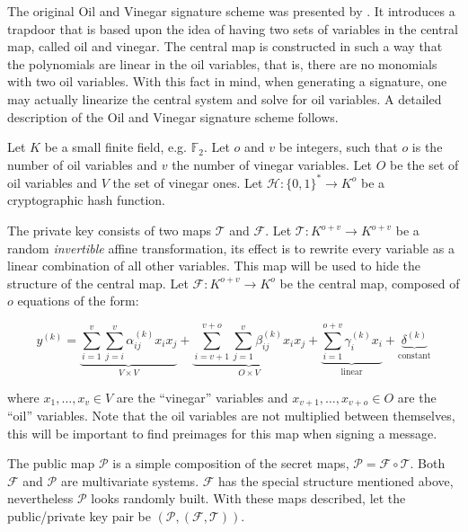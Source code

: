 \documentclass{ufsctex/ufsctex}
\begin{document}
The original Oil and Vinegar signature scheme was presented by
\cite{patarin1997ov}. It introduces a trapdoor that is based upon the idea of
having two sets of variables in the central map, called oil and vinegar. The
central map is constructed in such a way that the polynomials are linear in the
oil variables, that is, there are no monomials with two oil variables. With
this fact in mind, when generating a signature, one may actually linearize the
central system and solve for oil variables. A detailed description of the Oil
and Vinegar signature scheme follows.

Let $K$ be a small finite field, e.g. $\mathbb{F}_2$. Let $o$ and $v$ be
integers, such that $o$ is the number of oil variables and $v$ the number of
vinegar variables. Let $O$ be the set of oil variables and $V$ the set of
vinegar ones. Let $\mathcal{H}: \{0,1\}^* \to K^o$ be a cryptographic hash
function.

The private key consists of two maps $\mathcal{T}$ and $\mathcal{F}$. Let
$\mathcal{T}: K^{o+v} \to K^{o+v}$ be a random \textit{invertible} affine
transformation, its effect is to rewrite every variable as a linear combination
of all other variables. This map will be used to hide the structure of the
central map. Let $\mathcal{F}: K^{o+v} \to K^{o}$ be the central map, composed
of $o$ equations of the form:

\begin{equation}\label{eq:ovpolynomial}
y^{(k)} =
\underbrace{\sum_{i=1}^{v}\sum_{j=i}^{v} \alpha^{(k)}_{ij} x_i x_j}_{
V \times V} +
\underbrace{\sum_{i=v+1}^{v+o}\sum_{j=1}^{v} \beta^{(k)}_{ij} x_i x_j}_{
O \times V} +
\underbrace{\sum_{i=1}^{o+v} \gamma^{(k)}_{i} x_i}_{\text{linear}} +
\underbrace{\delta^{(k)}}_{\text{constant}}
\end{equation}

where $x_1,\dots,x_v \in V$ are the ``vinegar'' variables and
$x_{v+1},\dots,x_{v+o} \in O$ are the ``oil'' variables. Note that the oil
variables are not multiplied between themselves, this will be important to find
preimages for this map when signing a message.

The public map $\mathcal{P}$ is a simple composition of the secret maps,
$\mathcal{P} = \mathcal{F} \circ \mathcal{T}$. Both $\mathcal{F}$ and
$\mathcal{P}$ are multivariate systems. $\mathcal{F}$ has the special structure
mentioned above, nevertheless $\mathcal{P}$ looks randomly built. With these
maps described, let the public/private key pair be
$(\mathcal{P},(\mathcal{F},\mathcal{T}))$.
\end{document}
